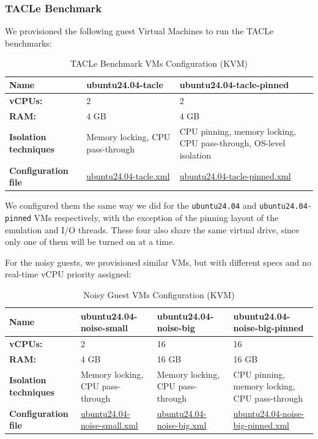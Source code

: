 \subsubsection{TACLe Benchmark}\label{tacle-benchmark}

We provisioned the following guest Virtual Machines to run the TACLe
benchmarks:

\begin{table}
\centering
\caption{TACLe Benchmark VMs Configuration (KVM)}
\label{tab:setup:kvm-tacle}
\begin{tabularx}{\linewidth}{@{}YYY@{}}
\toprule
Name & ubuntu24.04-tacle & ubuntu24.04-tacle-pinned\tabularnewline
\midrule
\textbf{vCPUs:} & 2 & 2\tabularnewline
\textbf{RAM:} & 4 GB & 4 GB\tabularnewline
\textbf{Isolation techniques} & Memory locking, CPU pass-through & CPU pinning, memory locking, CPU pass-through, OS-level isolation\tabularnewline
\textbf{Configuration file} & \href{KVM/vms/ubuntu24.04-tacle.xml}{ubuntu24.04-tacle.xml} & \href{KVM/vms/ubuntu24.04-tacle-pinned.xml}{ubuntu24.04-tacle-pinned.xml}\tabularnewline
\bottomrule
\end{tabularx}
\end{table}

We configured them the same way we did for the \texttt{ubuntu24.04} and
\texttt{ubuntu24.04-pinned} VMs respectively, with the exception of the
pinning layout of the emulation and I/O threads. These four also share
the same virtual drive, since only one of them will be turned on at a
time.

For the noisy guests, we provisioned similar VMs, but with different
specs and no real-time vCPU priority assigned:

\begin{table}
\centering
\caption{Noisy Guest VMs Configuration (KVM)}
\label{tab:setup:kvm-noisy}
\begin{tabularx}{\linewidth}{@{}YYYY@{}}
\toprule
Name & ubuntu24.04-noise-small & ubuntu24.04-noise-big & ubuntu24.04-noise-big-pinned\tabularnewline
\midrule
\textbf{vCPUs:} & 2 & 16 & 16\tabularnewline
\textbf{RAM:} & 4 GB & 16 GB & 16 GB\tabularnewline
\textbf{Isolation techniques} & Memory locking, CPU pass-through & Memory locking, CPU pass-through & CPU pinning, memory locking, CPU pass-through\tabularnewline
\textbf{Configuration file} & \href{KVM/vms/ubuntu24.04-noise-small.xml}{ubuntu24.04-noise-small.xml} & \href{KVM/vms/ubuntu24.04-noise-big.xml}{ubuntu24.04-noise-big.xml} & \href{KVM/vms/ubuntu24.04-noise-big-pinned.xml}{ubuntu24.04-noise-big-pinned.xml}\tabularnewline
\bottomrule
\end{tabularx}
\end{table}

